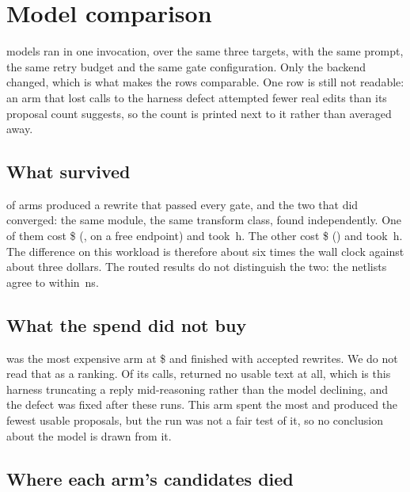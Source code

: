 \documentclass[11pt,a4paper]{article}
\begin{document}
\section{Model comparison}

\armstotal{} models ran in one invocation, over the same three targets, with
the same prompt, the same retry budget and the same gate configuration. Only
the backend changed, which is what makes the rows comparable. One row is still
not readable: an arm that lost calls to the harness defect
attempted fewer real edits than its proposal count suggests, so the count is
printed next to it rather than averaged away.





\subsection{What survived}

\armssurviving{} of \armstotal{} arms produced a rewrite that passed every
gate, and the two that did converged: the same module, the same transform
class, found independently. One of them cost \$\armcheapcost{}
(\armcheapname, on a free endpoint) and took \armcheaphours\,h. The other
cost \$\armpaidcost{} (\armpaidname) and took \armpaidhours\,h. The difference on this workload is therefore about six times the wall clock
against about three dollars. The routed results do not distinguish the two:
the netlists agree to within \bestagreement\,ns.

\subsection{What the spend did not buy}

\armtopname{} was the most expensive arm at \$\armtopcost{} and finished with
\armtopaccepted{} accepted rewrites. We do not read that as a ranking. Of its
\armtopproposals{} calls, \armtoplost{} returned no usable text at all, which
is this harness truncating a reply mid-reasoning rather than the model
declining, and the defect was fixed after these runs. This arm spent the most and
produced the fewest usable proposals, but the run was not a fair test of it, so
no conclusion about the model is drawn from it.

\subsection{Where each arm's candidates died}
\end{document}
